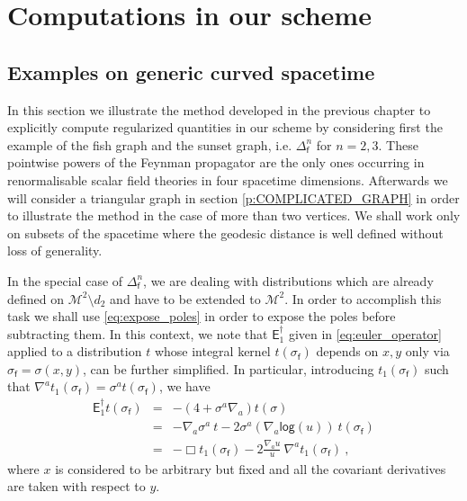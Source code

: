 \documentclass[11pt]{book}
\renewcommand{\log}{\mathsf{log}}
\newcommand{\Mcal}{\mathcal{M}}
\newcommand{\Esf}{\mathsf{E}}
\newcommand{\fsf}{\mathsf{f}}
\theoremstyle{break}
\begin{document}
\chapter{Computations in our scheme}


\section{Examples on generic curved spacetime}
\label{p:EXOS}


In this section we illustrate the method developed in the previous chapter to explicitly compute regularized quantities in our scheme by considering first the example of the fish graph and the sunset graph, i.e. $\Delta^n_\fsf$ for $n=2,3$. These pointwise powers of the Feynman propagator are the only ones occurring in renormalisable scalar field theories in four spacetime dimensions. Afterwards we will consider a triangular graph in section \ref{p:COMPLICATED_GRAPH} in order to illustrate the method in the case of more than two vertices. We shall work only on subsets of the spacetime where the geodesic distance is well defined without loss of generality.


In the special case of $\Delta^n_\fsf$, we are dealing with distributions which are already defined on $\Mcal^2\setminus d_2$ and have to be extended to $\Mcal^2$. In order to accomplish this task we shall use \eqref{eq:expose_poles} in order to expose the poles before subtracting them. In this context, we note that  $\Esf^\dagger_1$ given in \eqref{eq:euler_operator} applied to a distribution $t$ whose integral kernel $t(\sigma_\fsf)$ depends on $x,y$  only via $\sigma_\fsf = \sigma(x,y)$, can be further simplified. In particular, introducing $t_1(\sigma_\fsf)$ such that $\nabla^a t_1(\sigma_\fsf) = \sigma^a t(\sigma_\fsf)$, we have
%
\begin{eqnarray}
\Esf_1^\dagger t(\sigma_\fsf) &=& -\left( 4 + \sigma^a\nabla_a \right) t(\sigma) \nonumber \\
&=& - \nabla_a \sigma^a \ t - 2 \sigma^a (\nabla_a \log (u)) \ t(\sigma_\fsf) \nonumber \\ 
&=& - \Box t_1(\sigma_\fsf) - 2 \frac{\nabla_a u}{u} \ \nabla^a t_1(\sigma_\fsf) \ , 
\label{eq:E_simplified}
\end{eqnarray}
%
where $x$ is considered to be arbitrary but fixed and all the covariant derivatives are taken with respect to $y$.
\end{document}

